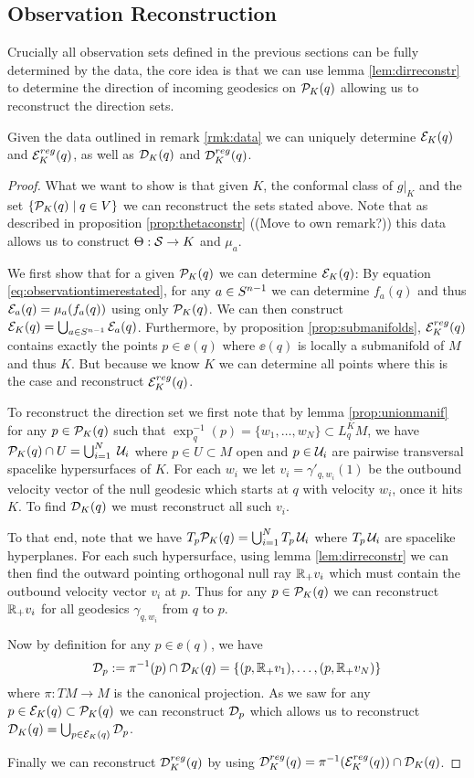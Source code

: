 \subsection{Observation Reconstruction}
Crucially all observation sets defined in the previous sections can be fully determined by the data, the core idea is that we can use lemma \ref{lem:dirreconstr} to determine the direction of incoming geodesics on ${\mathcal{P}}_K(q)$ allowing us to reconstruct the direction sets.
\begin{proposition}\label{prop:obsreconstr}
    Given the data outlined in remark \ref{rmk:data} we can uniquely determine ${\mathcal{E}}_K(q)$ and ${\mathcal{E}}^{reg}_K(q)$, as well as ${\mathcal{D}}_K(q)$ and ${\mathcal{D}}^{reg}_K(q)$.
\end{proposition}
\begin{proof}
    What we want to show is that given $K$, the conformal class of $g\rvert_{K}$ and the set $\{{{\mathcal{P}}_K(q)} \mid q\in V\}$ we can reconstruct the sets stated above. Note that as described in proposition \ref{prop:thetaconstr} ((Move to own remark?)) this data allows us to construct $\Theta:{\mathcal{S}}\to K$ and $\mu_a$.

    We first show that for a given ${\mathcal{P}}_K(q)$ we can determine ${\mathcal{E}}_K(q)$: By equation \ref{eq:observationtimerestated}, for any $a\in {S^{n-1}}$ we can determine $f_a(q)$ and thus ${\mathcal{E}}_a(q)=\mu_a(f_a(q))$ using only ${{\mathcal{P}}_K(q)}$. We can then construct ${\mathcal{E}}_K(q) = \bigcup_{a\in {S^{n-1}}} {\mathcal{E}}_a(q)$. Furthermore, by proposition \ref{prop:submanifolds}, ${{\mathcal{E}}^{reg}_K}(q)$ contains exactly the points $p\in \ee(q)$ where $\ee(q)$ is locally a submanifold of $M$ and thus $K$. But because we know $K$ we can determine all points where this is the case and reconstruct ${{\mathcal{E}}^{reg}_K}(q)$. 

    To reconstruct the direction set we first note that by lemma \ref{prop:unionmanif} for any $p\in {{\mathcal{P}}_K(q)}$ such that $\exp_q^{-1}(p)=\{w_1,\dots,w_N\}\subset L^K_qM$, we have ${{\mathcal{P}}_K(q)} \cap U = \bigcup_{i=1}^N\; \mathcal{U}_i$ where $p\in U\subset M$ open and $p\in \mathcal{U}_i$ are pairwise transversal spacelike hypersurfaces of $K$. For each $w_i$ we let $v_i=\gamma'_{q,w_i}(1)$ be the outbound velocity vector of the null geodesic which starts at $q$ with velocity $w_i$, once it hits $K$. To find ${\mathcal{D}}_K(q)$ we must reconstruct all such $v_i$.
    
    To that end, note that we have $T_p{{\mathcal{P}}_K(q)} = \bigcup_{i=1}^N T_p\,\mathcal{U}_i$ where $T_p\,\mathcal{U}_i$ are spacelike hyperplanes. For each such hypersurface, using lemma \ref{lem:dirreconstr} we can then find the outward pointing orthogonal null ray $\mathbb{R}_+v_i$ which must contain the outbound velocity vector $v_i$ at $p$. Thus for any $p\in {{\mathcal{P}}_K(q)}$ we can reconstruct $\mathbb{R}_+v_i$ for all geodesics $\gamma_{q,w_i}$ from $q$ to $p$.

   Now by definition for any $p\in \ee(q)$, we have 
    \[
        {\mathcal{D}}_p := \pi^{-1}(p)\cap {\mathcal{D}}_K(q) = \{(p,\mathbb{R}_+v_1), \dots, (p,\mathbb{R}_+v_N)\}
    \]
    where $\pi:TM\to M$ is the canonical projection. As we saw for any $p\in {{\mathcal{E}}_K}(q)\subset {{\mathcal{P}}_K(q)}$ we can reconstruct ${\mathcal{D}}_p$ which allows us to reconstruct ${\mathcal{D}}_K(q) = \bigcup_{p\in {{\mathcal{E}}_K}(q)} {\mathcal{D}}_p$.

    Finally we can reconstruct ${\mathcal{D}}^{reg}_K(q)$ by using ${\mathcal{D}}^{reg}_K(q)=\pi^{-1}({{\mathcal{E}}^{reg}_K}(q)) \cap {\mathcal{D}}_K(q)$.
\end{proof}
